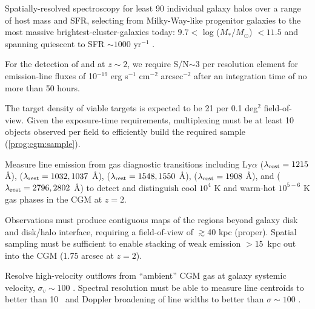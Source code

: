 \documentclass[11pt,a4paper,twoside,onecolumn,openany,final,oldfontcommands]{memoir}
\begin{document}
\begin{programrequirement}
\reqitem Spatially-resolved spectroscopy for least 90 individual galaxy halos over a range of host mass and SFR, selecting from Milky-Way-like progenitor galaxies to the most massive brightest-cluster-galaxies today: $9.7 <$ log ($M_*/M_\odot$) $< 11.5$ and spanning quiescent to SFR $\sim 1000$ yr$^{-1}$ \citep{Papovich:2015_progenitorMasses,Conroy:2007_buildUpMassive}. \label{prog:cgm:sample}

\reqitem For the detection of  and  at $z\sim 2$, we require S/N$\sim$3 per resolution element for emission-line fluxes of 10$^{-19}$ erg s$^{-1}$ cm$^{-2}$ arcsec$^{-2}$ after an integration time of no more than 50 hours.

\reqitem The target density of viable targets is expected to be 21 per 0.1 deg$^2$ field-of-view.  Given the exposure-time requirements, multiplexing must be at least 10 objects observed per field to efficiently build the required sample (\ref{prog:cgm:sample}).
\end{programrequirement}

\medskip
\begin{sciencerequirement}
\reqitem Measure line emission from gas diagnostic transitions including  Ly$\alpha$ ($\lambda_{\rm rest} = 1215$ \AA),   ($\lambda_{\rm rest} = 1032, 1037$ \AA),  ($\lambda_{\rm rest} = 1548, 1550$ \AA),  ($\lambda_{\rm rest} = 1908$ \AA), and  ($\lambda_{\rm rest} = 2796, 2802$ \AA) to detect and distinguish cool $10^4$ K and warm-hot $10^{5-6}$ K gas phases in the CGM at $z = 2$. 

\reqitem Observations must produce contiguous maps of the regions beyond galaxy disk and disk/halo interface, requiring a field-of-view of $\gtrsim$40 kpc (proper).
\reqitem Spatial sampling must be sufficient to enable stacking of weak emission $>15$~kpc out into the CGM ($1.75$ arcsec at $z=2$).

\reqitem Resolve high-velocity outflows from ``ambient'' CGM gas at galaxy systemic velocity, $\sigma_v \sim 100$ \kms.  
\reqitem Spectral resolution must be able to measure line centroids to better than 10 \kms\ and Doppler broadening of line widths to better than $\sigma \sim 100$ \kms. 
\end{sciencerequirement}


\end{document}
